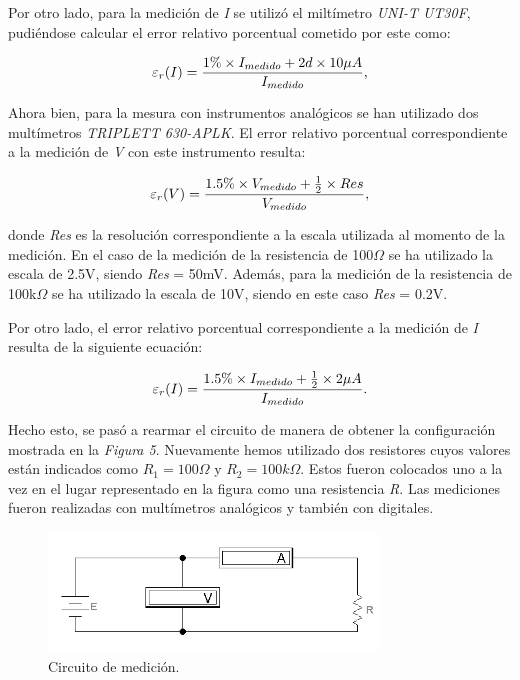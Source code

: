 \documentclass{article}
\begin{document}
	Por otro lado, para la medición de \textit{I} se utilizó el miltímetro \textit{UNI-T UT30F}, pudiéndose calcular el error relativo porcentual cometido por este como:
\medskip

\begin{equation}
 	\varepsilon_r(I) = {1\%\times I_{medido} + 2d\times10\mu A \over I_{medido}},
\end{equation}
\smallskip


	Ahora bien, para la mesura con instrumentos analógicos se han utilizado dos multímetros \textit{TRIPLETT 630-APLK}. El error relativo porcentual correspondiente a la medición de \textit{V} con este instrumento resulta:
\medskip

\begin{equation}
 	\varepsilon_r(V) = {1.5\%\times V_{medido} + {1 \over 2}\times Res \over V_{medido}},
\end{equation}
\smallskip	

\noindent donde \textit{Res} es la resolución correspondiente a la escala utilizada al momento de la medición. En el caso de la medición de la resistencia de 100$\Omega$ se ha utilizado la escala de 2.5V, siendo \textit{Res} = 50mV. Además, para la medición de la resistencia de 100k$\Omega$ se ha utilizado la escala de 10V, siendo en este caso \textit{Res} = 0.2V. 
	\par
	Por otro lado, el error relativo porcentual correspondiente a la medición de \textit{I} resulta de la siguiente ecuación:
\medskip

\begin{equation}
 	\varepsilon_r(I) = {1.5\%\times I_{medido} + {1 \over 2}\times 2\mu A \over I_{medido}}. 
\end{equation}
\bigskip



	Hecho esto, se pasó a rearmar el circuito de manera de obtener la configuración mostrada en la \textit{Figura 5}. Nuevamente hemos utilizado dos resistores cuyos valores están indicados como \textit{$R_1=100\Omega$} y \textit{$R_2=100k\Omega$}. Estos fueron colocados uno a la vez en el lugar representado en la figura como una resistencia \textit{R}. Las mediciones fueron realizadas con multímetros analógicos y también con digitales.
\bigskip

\begin{figure}[h]
	\centering
	\includegraphics[width=0.78\textwidth]{images/p2-item-b.jpg}
	\caption{Circuito de medición.}
\end{figure}
\bigskip\bigskip
\end{document}

